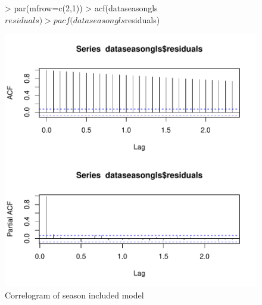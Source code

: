 \documentclass[11pt, a4paper]{article} %
\begin{document}
\begin{figure}[H]
\centering
\begin{Schunk}
\begin{Sinput}
> par(mfrow=c(2,1))
> acf(dataseasongls$residuals)
> pacf(dataseasongls$residuals)
\end{Sinput}
\end{Schunk}
\includegraphics{alleselena-corseas}
\caption{Correlogram of season included model}
\label{corseas}
\end{figure}
\end{document}
